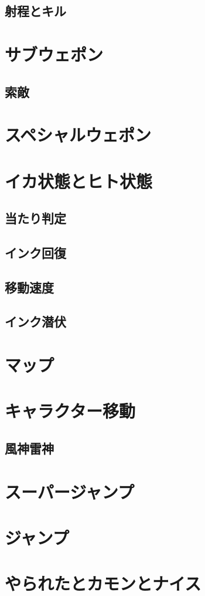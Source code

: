 \documentclass[a4paper,11pt]{jsbook}
\begin{document}
\section{射程とキル}
\chapter{サブウェポン}
\section{索敵}
\chapter{スペシャルウェポン}
\chapter{イカ状態とヒト状態}
\section{当たり判定}
\section{インク回復}
\section{移動速度}
\section{インク潜伏}
\chapter{マップ}
\chapter{キャラクター移動}
\section{風神雷神}
\chapter{スーパージャンプ}
\chapter{ジャンプ}
\chapter{やられたとカモンとナイス}
\end{document}
